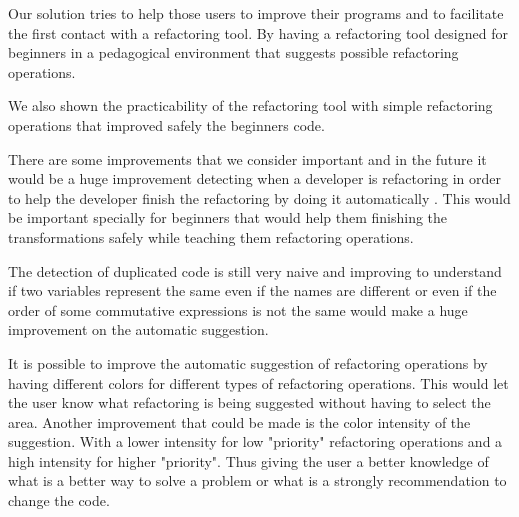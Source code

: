 Our solution tries to help those users to improve their programs and to facilitate
the first contact with a refactoring tool.
By having a refactoring tool designed for beginners in a pedagogical environment
that suggests possible refactoring operations.

We also shown the practicability of the refactoring tool with simple refactoring operations
that improved safely the beginners code.


There are some improvements that we consider important and in the future it would  %
be a huge improvement detecting when a developer is refactoring in order to help the developer finish the
refactoring by doing it automatically \cite{ge2012reconciling}.
This would be important specially for beginners that would help them finishing
the transformations safely while teaching them refactoring operations. %

The detection of duplicated code is still very naive and improving to understand if
two variables represent the same even if the names are different or even if the
 order of some commutative expressions is not the same would make a huge improvement
 on the automatic suggestion.



It is possible to improve the automatic suggestion of refactoring operations by
having different colors for different types of refactoring operations.
This would let the user know what refactoring is being suggested without having to
select the area.
Another improvement that could be made is the color intensity of the suggestion.
With a lower intensity for low "priority" refactoring operations and a high intensity
for higher "priority". Thus giving the user a better knowledge of what is a better
way to solve a problem or what is a strongly recommendation to change the code.
